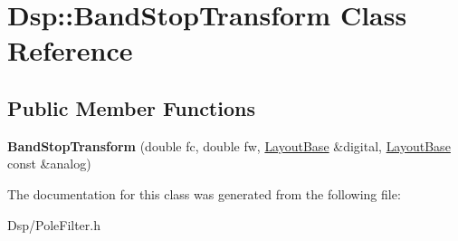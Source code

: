 \hypertarget{classDsp_1_1BandStopTransform}{\section{Dsp\-:\-:Band\-Stop\-Transform Class Reference}
\label{classDsp_1_1BandStopTransform}
}
\subsection*{Public Member Functions}
\begin{DoxyCompactItemize}
\item 
\hypertarget{classDsp_1_1BandStopTransform_a5d77c3da527efab296495765705c04e0}{{\bfseries Band\-Stop\-Transform} (double fc, double fw, \hyperlink{classDsp_1_1LayoutBase}{Layout\-Base} \&digital, \hyperlink{classDsp_1_1LayoutBase}{Layout\-Base} const \&analog)}\label{classDsp_1_1BandStopTransform_a5d77c3da527efab296495765705c04e0}

\end{DoxyCompactItemize}


The documentation for this class was generated from the following file\-:\begin{DoxyCompactItemize}
\item 
Dsp/Pole\-Filter.\-h\end{DoxyCompactItemize}

